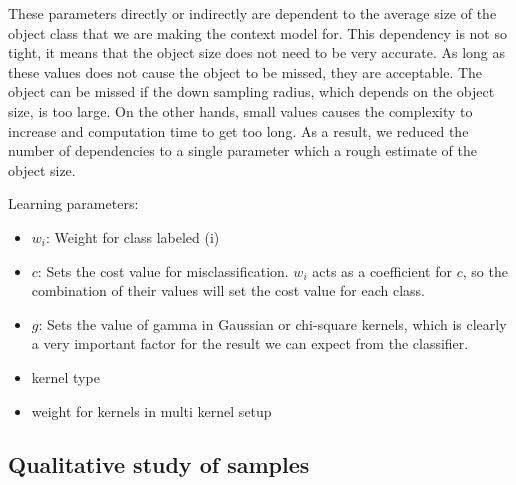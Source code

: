 These parameters directly or indirectly are dependent to the average size of the object class that we are making the context model
for. 
This dependency is not so tight, it means that the object size does not need to be very accurate. 
As long as these values does not cause the object to be missed, they are acceptable.
The object can be missed if the down sampling radius, which depends on the object size, is too large. 
On the other hands, small values causes the complexity to increase and computation time to get too long.  
As a result, we reduced the number of dependencies to a single parameter which a rough estimate of the object size.


Learning parameters:
\begin{itemize}
 \item $w_i$: Weight for class labeled (i)
 \item $c$: Sets the cost value for misclassification.
 $w_i$ acts as a coefficient for $c$, so the combination of their values will set the cost value for each class.
 \item $g$: Sets the value of gamma in Gaussian or chi-square kernels, which is clearly a very important factor for the result we can 
expect from the classifier. 
 \item kernel type
 \item weight for kernels in multi kernel setup
\end{itemize}


\subsection{Qualitative study of samples}
\label{QStudy.ssec}

